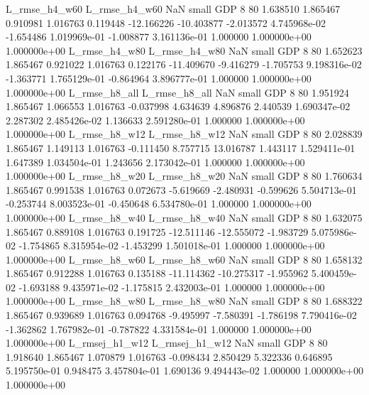  L_rmse_h4_w60  L_rmse_h4_w60                   NaN      small      GDP                 8 80 1.638510       1.865467 0.910981       1.016763    0.119448    -12.166226    -10.403877    -2.013572   4.745968e-02 -1.654486 1.019969e-01    -1.008877   3.161136e-01            1.000000    1.000000e+00        1.000000e+00
 L_rmse_h4_w80  L_rmse_h4_w80                   NaN      small      GDP                 8 80 1.652623       1.865467 0.921022       1.016763    0.122176    -11.409670     -9.416279    -1.705753   9.198316e-02 -1.363771 1.765129e-01    -0.864964   3.896777e-01            1.000000    1.000000e+00        1.000000e+00
 L_rmse_h8_all  L_rmse_h8_all                   NaN      small      GDP                 8 80 1.951924       1.865467 1.066553       1.016763   -0.037998      4.634639      4.896876     2.440539   1.690347e-02  2.287302 2.485426e-02     1.136633   2.591280e-01            1.000000    1.000000e+00        1.000000e+00
 L_rmse_h8_w12  L_rmse_h8_w12                   NaN      small      GDP                 8 80 2.028839       1.865467 1.149113       1.016763   -0.111450      8.757715     13.016787     1.443117   1.529411e-01  1.647389 1.034504e-01     1.243656   2.173042e-01            1.000000    1.000000e+00        1.000000e+00
 L_rmse_h8_w20  L_rmse_h8_w20                   NaN      small      GDP                 8 80 1.760634       1.865467 0.991538       1.016763    0.072673     -5.619669     -2.480931    -0.599626   5.504713e-01 -0.253744 8.003523e-01    -0.450648   6.534780e-01            1.000000    1.000000e+00        1.000000e+00
 L_rmse_h8_w40  L_rmse_h8_w40                   NaN      small      GDP                 8 80 1.632075       1.865467 0.889108       1.016763    0.191725    -12.511146    -12.555072    -1.983729   5.075986e-02 -1.754865 8.315954e-02    -1.453299   1.501018e-01            1.000000    1.000000e+00        1.000000e+00
 L_rmse_h8_w60  L_rmse_h8_w60                   NaN      small      GDP                 8 80 1.658132       1.865467 0.912288       1.016763    0.135188    -11.114362    -10.275317    -1.955962   5.400459e-02 -1.693188 9.435971e-02    -1.175815   2.432003e-01            1.000000    1.000000e+00        1.000000e+00
 L_rmse_h8_w80  L_rmse_h8_w80                   NaN      small      GDP                 8 80 1.688322       1.865467 0.939689       1.016763    0.094768     -9.495997     -7.580391    -1.786198   7.790416e-02 -1.362862 1.767982e-01    -0.787822   4.331584e-01            1.000000    1.000000e+00        1.000000e+00
L_rmsej_h1_w12 L_rmsej_h1_w12                   NaN      small      GDP                 8 80 1.918640       1.865467 1.070879       1.016763   -0.098434      2.850429      5.322336     0.646895   5.195750e-01  0.948475 3.457804e-01     1.690136   9.494443e-02            1.000000    1.000000e+00        1.000000e+00
